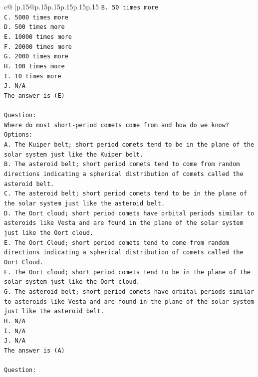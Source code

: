 \documentclass{article}
\begin{document}
{\begin{supertabular}{c@{$\;$}|p{.15\linewidth}@{}p{.15\linewidth}p{.15\linewidth}p{.15\linewidth}p{.15\linewidth}p{.15\linewidth}}
{{{\texttt{B. 50 times more} \\
\texttt{C. 5000 times more} \\
\texttt{D. 500 times more} \\
\texttt{E. 10000 times more} \\
\texttt{F. 20000 times more} \\
\texttt{G. 2000 times more} \\
\texttt{H. 100 times more} \\
\texttt{I. 10 times more} \\
\texttt{J. N/A} \\
\texttt{The answer is (E)} \\
\\ 
\texttt{Question:} \\
\texttt{Where do most short{-}period comets come from and how do we know?} \\
\texttt{Options:} \\
\texttt{A. The Kuiper belt; short period comets tend to be in the plane of the solar system just like the Kuiper belt.} \\
\texttt{B. The asteroid belt; short period comets tend to come from random directions indicating a spherical distribution of comets called the asteroid belt.} \\
\texttt{C. The asteroid belt; short period comets tend to be in the plane of the solar system just like the asteroid belt.} \\
\texttt{D. The Oort cloud; short period comets have orbital periods similar to asteroids like Vesta and are found in the plane of the solar system just like the Oort cloud.} \\
\texttt{E. The Oort Cloud; short period comets tend to come from random directions indicating a spherical distribution of comets called the Oort Cloud.} \\
\texttt{F. The Oort cloud; short period comets tend to be in the plane of the solar system just like the Oort cloud.} \\
\texttt{G. The asteroid belt; short period comets have orbital periods similar to asteroids like Vesta and are found in the plane of the solar system just like the asteroid belt.} \\
\texttt{H. N/A} \\
\texttt{I. N/A} \\
\texttt{J. N/A} \\
\texttt{The answer is (A)} \\
\\ 
\texttt{Question:} \\
}}}
\end{supertabular}}
\end{document}
